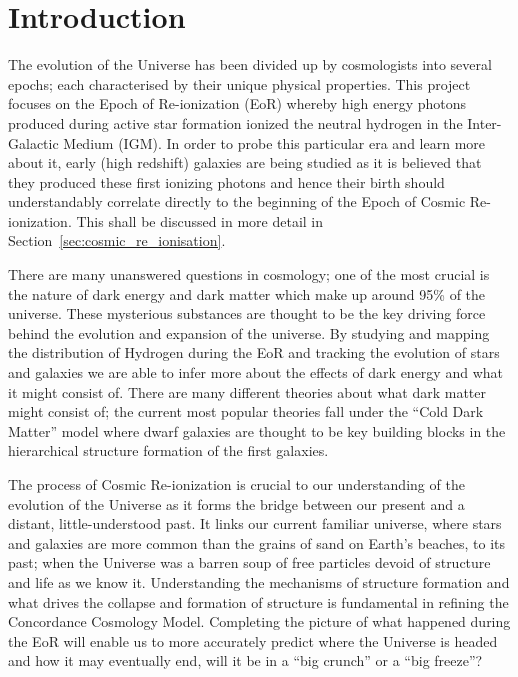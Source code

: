 
\section{Introduction} %
\label{section:Introduction}
	The evolution of the Universe has been divided up by cosmologists into several epochs; each characterised by their unique physical properties. This project focuses on the Epoch of Re-ionization (EoR) whereby high energy photons produced during active star formation ionized the neutral hydrogen in the Inter-Galactic Medium (IGM). In order to probe this particular era and learn more about it, early (high redshift) galaxies are being studied as it is believed that they produced these first ionizing photons and hence their birth should understandably correlate directly to the beginning of the Epoch of Cosmic Re-ionization. This shall be discussed in more detail in Section~\ref{sec:cosmic_re_ionisation}.

	There are many unanswered questions in cosmology; one of the most crucial is the nature of dark energy and dark matter which make up around 95\% of the universe\cite{WMAP9}. These mysterious substances are thought to be the key driving force behind the evolution and expansion of the universe. By studying and mapping the distribution of Hydrogen during the EoR and tracking the evolution of stars and galaxies we are able to infer more about the effects of dark energy and what it might consist of. There are many different theories about what dark matter might consist of; the current most popular theories fall under the ``Cold Dark Matter'' model where dwarf galaxies are thought to be key building blocks in the hierarchical structure formation of the first galaxies\cite{Cignoni}.

	The process of Cosmic Re-ionization is crucial to our understanding of the evolution of the Universe as it forms the bridge between our present and a distant, little-understood past. It links our current familiar universe, where stars and galaxies are more common than the grains of sand on Earth's beaches, to its past; when the Universe was a barren soup of free particles devoid of structure and life as we know it. Understanding the mechanisms of structure formation and what drives the collapse and formation of structure is fundamental in refining the Concordance Cosmology Model. Completing the picture of what happened during the EoR will enable us to more accurately predict where the Universe is headed and how it may eventually end, will it be in a ``big crunch'' or a ``big freeze''?

